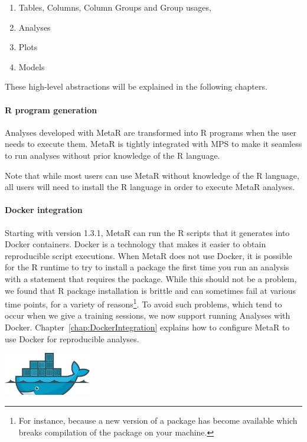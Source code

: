 \begin{enumerate}
	\item Tables, Columns, Column Groups and Group usages,
	\item Analyses
	\item Plots
	\item Models
\end{enumerate}

\noindent{}These high-level abstractions will be explained in the following chapters.

\paragraph{R program generation}
Analyses developed with MetaR are transformed into R programs when the user needs to execute them. MetaR is tightly integrated with MPS to make it seamless to run analyses without prior knowledge of the R language.
\begin{remark}
Note that while most users can use MetaR without knowledge of the R language, all users will need to install the R language in order to execute MetaR analyses.
\end{remark}

\paragraph{Docker integration}

Starting with version 1.3.1, MetaR can run the R scripts that it generates into Docker containers. Docker is a technology that makes it easier to obtain reproducible script executions. When MetaR does not use Docker, it is possible for the R runtime to try to install a package the first time you run an analysis with a statement that requires the package. While this should not be a problem, we found that R package installation is brittle and can sometimes fail at various time points, for a variety of reasons\footnote{For instance, because a new version of a package has become available which breaks compilation of the package on your machine.}. To avoid such problems, which tend to occur when we give a training sessions, we now support running Analyses with Docker. Chapter~\ref{chap:DockerIntegration} explains how to configure MetaR to use Docker for reproducible analyses.
\mbox{}
\begin{flushright}
\includegraphics[width=1.5in]{figures/DockerImage.png}
\end{flushright}
